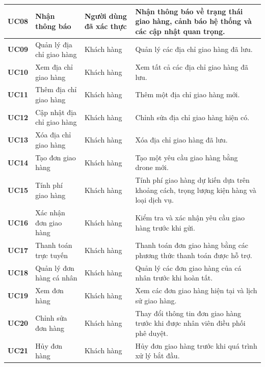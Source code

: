 \begin{longtable}{|p{1.2cm}|p{3.5cm}|p{2.8cm}|p{6.5cm}|}
\textbf{UC08} & Nhận thông báo & Người dùng đã xác thực &
Nhận thông báo về trạng thái giao hàng, cảnh báo hệ thống và các cập nhật quan trọng. \\
\hline

\textbf{UC09} & Quản lý địa chỉ giao hàng & Khách hàng &
Quản lý các địa chỉ giao hàng đã lưu. \\
\hline

\textbf{UC10} & Xem địa chỉ giao hàng & Khách hàng &
Xem tất cả các địa chỉ giao hàng đã lưu. \\
\hline

\textbf{UC11} & Thêm địa chỉ giao hàng & Khách hàng &
Thêm một địa chỉ giao hàng mới. \\
\hline

\textbf{UC12} & Cập nhật địa chỉ giao hàng & Khách hàng &
Chỉnh sửa địa chỉ giao hàng hiện có. \\
\hline

\textbf{UC13} & Xóa địa chỉ giao hàng & Khách hàng &
Xóa địa chỉ giao hàng đã lưu. \\
\hline

\textbf{UC14} & Tạo đơn giao hàng & Khách hàng &
Tạo một yêu cầu giao hàng bằng drone mới. \\
\hline

\textbf{UC15} & Tính phí giao hàng & Khách hàng &
Tính phí giao hàng dự kiến dựa trên khoảng cách, trọng lượng kiện hàng và loại dịch vụ. \\
\hline

\textbf{UC16} & Xác nhận đơn giao hàng & Khách hàng &
Kiểm tra và xác nhận yêu cầu giao hàng trước khi gửi. \\
\hline

\textbf{UC17} & Thanh toán trực tuyến & Khách hàng &
Thanh toán đơn giao hàng bằng các phương thức thanh toán được hỗ trợ. \\
\hline

\textbf{UC18} & Quản lý đơn hàng cá nhân & Khách hàng &
Quản lý các đơn giao hàng của cá nhân trước khi hoàn tất. \\
\hline

\textbf{UC19} & Xem đơn hàng & Khách hàng &
Xem các đơn giao hàng hiện tại và lịch sử giao hàng. \\
\hline

\textbf{UC20} & Chỉnh sửa đơn hàng & Khách hàng &
Thay đổi thông tin đơn giao hàng trước khi được nhân viên điều phối phê duyệt. \\
\hline

\textbf{UC21} & Hủy đơn hàng & Khách hàng &
Hủy đơn giao hàng trước khi quá trình xử lý bắt đầu. \\
\hline


\end{longtable}
